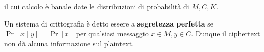 \noindent il cui calcolo è banale date le distribuzioni di probabilità di $M,C,K$.
    

\begin{definition}
    Un sistema di crittografia è detto essere a \textbf{segretezza perfetta} se $\Pr[x \mid y] = \Pr[x]$ per qualsiasi messaggio $x \in M, y \in C$. Dunque il ciphertext non dà alcuna informazione sul plaintext.
\end{definition}




   
    
    
